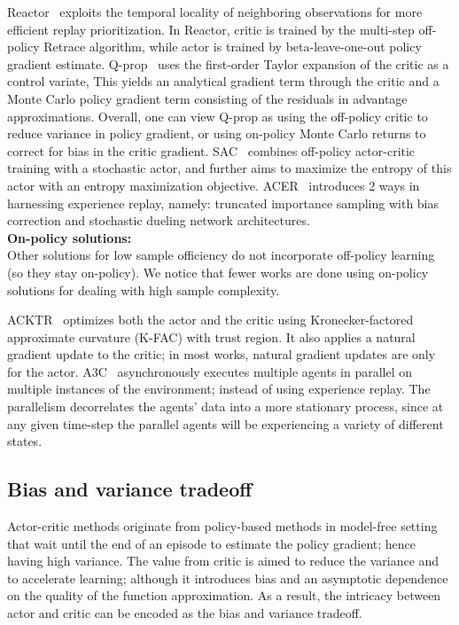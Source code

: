 Reactor~\cite{Gruslys2018} exploits the temporal locality of neighboring observations for
more efficient replay prioritization.
In Reactor, critic is trained by the multi-step off-policy Retrace algorithm,
while actor is trained by beta-leave-one-out policy gradient estimate.
Q-prop~\cite{} uses the first-order Taylor expansion of the critic as a control variate,
This yields an analytical gradient term through the critic and
a Monte Carlo policy gradient term consisting of the residuals in advantage approximations.
Overall, one can view Q-prop as
using the off-policy critic to reduce variance in policy gradient, or
using on-policy Monte Carlo returns to correct for bias in the critic gradient.
SAC~\cite{} combines off-policy actor-critic training with a stochastic actor, and
further aims to maximize the entropy of this actor with an entropy maximization objective.
ACER~\cite{} introduces 2 ways in harnessing experience replay, namely:
truncated importance sampling with bias correction and
stochastic dueling network architectures.\\

\noindent
\textbf{On-policy solutions:}\\
Other solutions for low sample officiency do not incorporate off-policy learning
(so they stay on-policy).
We notice that fewer works are done using on-policy solutions for dealing with high sample complexity.

ACKTR~\cite{} optimizes both the actor and the critic using
Kronecker-factored approximate curvature (K-FAC) with trust region.
It also applies a natural gradient update to the critic;
in most works, natural gradient updates are only for the actor.
A3C~\cite{} asynchronously executes multiple agents in parallel on multiple instances of the environment;
instead of using experience replay.
The parallelism decorrelates the agents’ data into a more stationary process, since
at any given time-step the parallel agents will be experiencing a variety of different states.

\subsection{Bias and variance tradeoff}
Actor-critic methods originate from policy-based methods in model-free setting that
wait until the end of an episode to estimate the policy gradient; hence having high variance.
The value from critic is aimed to reduce the variance and to accelerate learning;
although it introduces bias and an asymptotic dependence on the quality of the function approximation.
As a result, the intricacy between actor and critic can be encoded as the bias and variance tradeoff.

